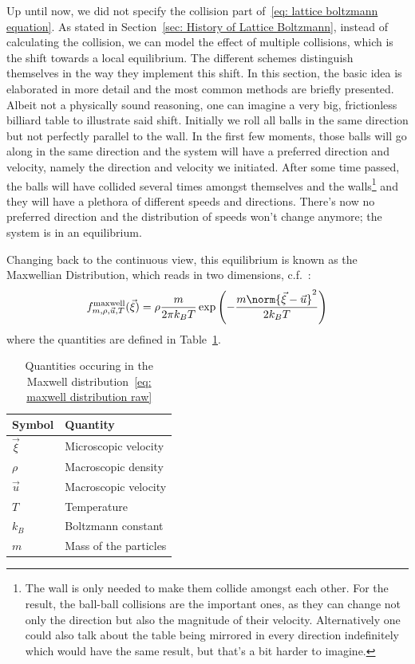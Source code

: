 Up until now, we did not specify the collision part of~\eqref{eq: lattice boltzmann equation}.
As stated in Section~\ref{sec: History of Lattice Boltzmann}, instead of calculating the collision, we can model the effect of multiple collisions, which is the shift towards a local equilibrium.
The different schemes distinguish themselves in the way they implement this shift.
In this section, the basic idea is elaborated in more detail and the most common methods are briefly presented.
\newlinedouble{}
Albeit not a physically sound reasoning, one can imagine a very big, frictionless billiard table to illustrate said shift.
Initially we roll all balls in the same direction but not perfectly parallel to the wall.
In the first few moments, those balls will go along in the same direction and the system will have a preferred direction and velocity, namely the direction and velocity we initiated.
After some time passed, the balls will have collided several times amongst themselves and the walls\footnote{The wall is only needed to make them collide amongst each other. For the result, the ball-ball collisions are the important ones, as they can change not only the direction but also the magnitude of their velocity. Alternatively one could also talk about the table being mirrored in every direction indefinitely which would have the same result, but that's a bit harder to imagine.} and they will have a plethora of different speeds and directions.
There's now no preferred direction and the distribution of speeds won't change anymore; the system is in an equilibrium.

Changing back to the continuous view, this equilibrium is known as the Maxwellian Distribution, which reads in two dimensions, c.f.~\cite{succi2001lattice}:
\begin{equation}
  \label{eq: maxwell distribution raw}
  f_{m, \rho, \vec{u}, T}^{\text{maxwell}}(\vec{\xi}) = \rho \frac{m}{2\pi k_B T} \exp \left( - \frac{m\norm{\vec{\xi}-\vec{u}}^2}{2 k_B T}\right)
\end{equation}
where the quantities are defined in Table~\ref{table: maxwell quantities}.
\begin{table} [h]
\centering
  \begin{tabular}{@{}ll@{}}
    \toprule
    Symbol & Quantity  \\
    \midrule
    $\vec{\xi}$  & Microscopic velocity  \\
    $\rho$ & Macroscopic density     \\
    $\vec{u}$    & Macroscopic velocity   \\
    $T$    & Temperature   \\
    $k_B$  & Boltzmann constant \\
    $m$    & Mass of the particles   \\
    \bottomrule
  \end{tabular}
\caption{Quantities occuring in the Maxwell distribution~\eqref{eq: maxwell distribution raw}}
\label{table: maxwell quantities}
\end{table}

